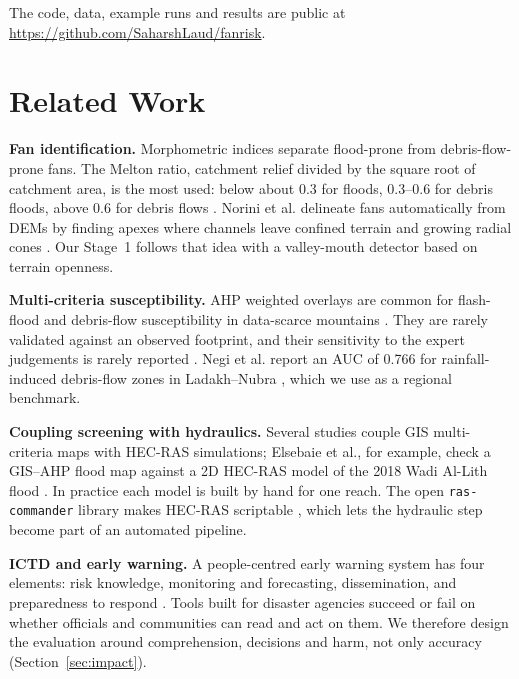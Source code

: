\documentclass[sigconf,nonacm]{acmart}
\begin{document}
The code, data, example runs and results are public at \url{https://github.com/SaharshLaud/fanrisk}.

\section{Related Work}
\textbf{Fan identification.} Morphometric indices separate flood-prone from debris-flow-prone fans. The Melton ratio, catchment relief divided by the square root of catchment area, is the most used: below about 0.3 for floods, 0.3--0.6 for debris floods, above 0.6 for debris flows \cite{wilford2004,descally2010,santangelo2012}. Norini et al. delineate fans automatically from DEMs by finding apexes where channels leave confined terrain and growing radial cones \cite{norini2016}. Our Stage~1 follows that idea with a valley-mouth detector based on terrain openness.

\textbf{Multi-criteria susceptibility.} AHP weighted overlays are common for flash-flood and debris-flow susceptibility in data-scarce mountains \cite{saaty1980,negi2020,elsebaie2023,karkani2021}. They are rarely validated against an observed footprint, and their sensitivity to the expert judgements is rarely reported \cite{feizizadeh2014,chen2010}. Negi et al. report an AUC of 0.766 for rainfall-induced debris-flow zones in Ladakh--Nubra \cite{negi2020}, which we use as a regional benchmark.

\textbf{Coupling screening with hydraulics.} Several studies couple GIS multi-criteria maps with HEC-RAS simulations; Elsebaie et al., for example, check a GIS--AHP flood map against a 2D HEC-RAS model of the 2018 Wadi Al-Lith flood \cite{elsebaie2023}. In practice each model is built by hand for one reach. The open \texttt{ras-commander} library makes HEC-RAS scriptable \cite{rascommander}, which lets the hydraulic step become part of an automated pipeline.

\textbf{ICTD and early warning.} A people-centred early warning system has four elements: risk knowledge, monitoring and forecasting, dissemination, and preparedness to respond \cite{wmo2018}. Tools built for disaster agencies succeed or fail on whether officials and communities can read and act on them. We therefore design the evaluation around comprehension, decisions and harm, not only accuracy (Section~\ref{sec:impact}).

\end{document}
